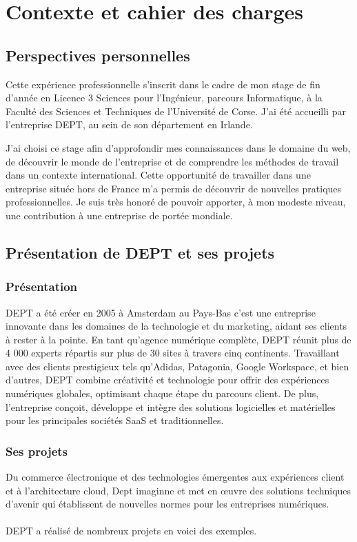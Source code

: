 \chapter{Contexte et cahier des charges}


\section{Perspectives personnelles}
Cette expérience professionnelle s'inscrit dans le cadre de mon stage de fin d'année en Licence 3 Sciences pour l'Ingénieur, parcours Informatique, à la Faculté des Sciences et Techniques de l'Université de Corse. J'ai été accueilli par l'entreprise DEPT, au sein de son département en Irlande.

J'ai choisi ce stage afin d'approfondir mes connaissances dans le domaine du web, de découvrir le monde de l'entreprise et de comprendre les méthodes de travail dans un contexte international. Cette opportunité de travailler dans une entreprise située hors de France m'a permis de découvrir de nouvelles pratiques professionnelles. Je suis très honoré de pouvoir apporter, à mon modeste niveau, une contribution à une entreprise de portée mondiale.


\section{Présentation de DEPT et ses projets}
\subsection{Présentation}
DEPT a été créer en 2005 à Amsterdam au Pays-Bas c'est une entreprise innovante dans les domaines de la technologie et du marketing, aidant ses clients à rester à la pointe. En tant qu'agence numérique complète, DEPT réunit plus de 4 000 experts répartis sur plus de 30 sites à travers cinq continents. Travaillant avec des clients prestigieux tels qu'Adidas, Patagonia, Google Workspace, et bien d'autres, DEPT combine créativité et technologie pour offrir des expériences numériques globales, optimisant chaque étape du parcours client. De plus, l'entreprise conçoit, développe et intègre des solutions logicielles et matérielles pour les principales sociétés SaaS et traditionnelles.

\subsection{Ses projets}
Du commerce électronique et des technologies émergentes aux expériences client et à l'architecture cloud, Dept imaginne et met en œuvre des solutions techniques d'avenir qui établissent de nouvelles normes pour les entreprises numériques.
\\ \\
DEPT a réalisé de nombreux projets en voici des exemples.


